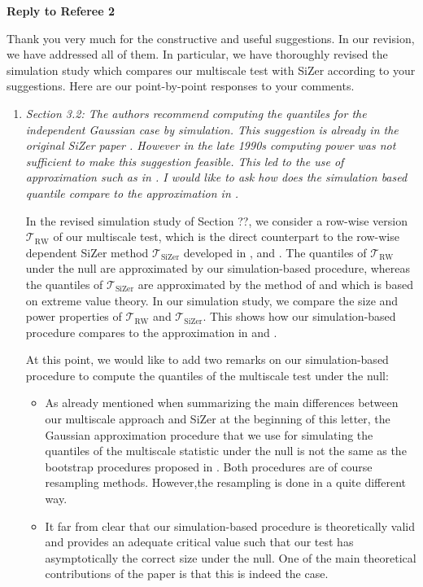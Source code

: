 \documentclass[a4paper,12pt]{article}
\begin{document}
\newpage
\begin{center}
{\large \bf Reply to Referee 2} 
\end{center}


Thank you very much for the constructive and useful suggestions. In our revision, we have addressed all of them. In particular, we have thoroughly revised the simulation study which compares our multiscale test with SiZer according to your suggestions. Here are our point-by-point responses to your comments. 


\begin{enumerate}[label=(\arabic*),leftmargin=0.8cm]

\item \textit{Section 3.2: The authors recommend computing the quantiles for the independent Gaussian case by simulation. This suggestion is already in the original SiZer paper \citep{ChaudhuriMarron1999}. However in the late 1990s computing power was not sufficient to make this suggestion feasible. This led to the use of approximation such as in \cite{HannigMarron2006}. I would like to ask how does the simulation based quantile compare to the approximation in \cite{HannigMarron2006}.} 

In the revised simulation study of Section ??, we consider a row-wise version $\mathcal{T}_{\text{RW}}$ of our multiscale test, which is the direct counterpart to the row-wise dependent SiZer method $\mathcal{T}_{\text{SiZer}}$ developed in \cite{Rondonotti2004}, \cite{Rondonotti2007} and \cite{ParkHannigKang2009}. The quantiles of $\mathcal{T}_{\text{RW}}$ under the null are approximated by our simulation-based procedure, whereas the quantiles of $\mathcal{T}_{\text{SiZer}}$ are approximated by the method of \cite{HannigMarron2006} and \cite{ParkHannigKang2009} which is based on extreme value theory. In our simulation study, we compare the size and power properties of $\mathcal{T}_{\text{RW}}$ and $\mathcal{T}_{\text{SiZer}}$. This shows how our simulation-based procedure compares to the approximation in \cite{HannigMarron2006} and \cite{ParkHannigKang2009}.

At this point, we would like to add two remarks on our simulation-based procedure to compute the quantiles of the multiscale test under the null: 
\begin{itemize}[leftmargin=0.5cm]
\item As already mentioned when summarizing the main differences between our multiscale approach and SiZer at the beginning of this letter, the Gaussian approximation procedure that we use for simulating the quantiles of the multiscale statistic under the null is not the same as the bootstrap procedures proposed in \cite{ChaudhuriMarron1999, ChaudhuriMarron2000}. Both procedures are of course resampling methods. However,the resampling is done in a quite different way. 
\item It far from clear that our simulation-based procedure is theoretically valid and provides an adequate critical value such that our test has asymptotically the correct size under the null. One of the main theoretical contributions of the paper is that this is indeed the case. 
\end{itemize}



\end{enumerate}
\end{document}
